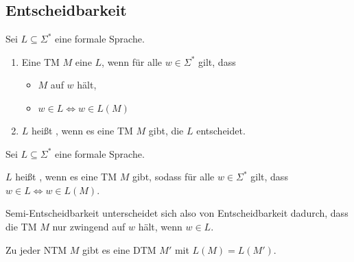 \subsection{Entscheidbarkeit}

\begin{definition}[Entscheidbarkeit]
	Sei $L \subseteq \Sigma^*$ eine formale Sprache.
	\begin{enumerate}
		\item
			Eine TM $M$  eine $L$, wenn für alle 
			$w \in \Sigma^*$ gilt, dass
			\begin{itemize}
				\item
					$M$ auf $w$ hält,
				\item
					$w \in L \Longleftrightarrow w \in L(M)$
			\end{itemize}
		\item
			$L$ heißt
			, wenn es eine TM $M$ gibt, die $L$ 
			entscheidet.
	\end{enumerate}
\end{definition}

\begin{definition}
	Sei $L \subseteq \Sigma^*$ eine formale Sprache.

	$L$ heißt , wenn es eine TM $M$ gibt, sodass für
	alle $w \in \Sigma^*$ gilt, dass $w \in L \Longleftrightarrow w \in
	L(M)$.
\end{definition}

\begin{remark}
	Semi-Entscheidbarkeit unterscheidet sich also von Entscheidbarkeit
	dadurch, dass die TM $M$ nur zwingend auf $w$ hält, wenn $w \in L$.
\end{remark}

\begin{theorem}
	Zu jeder NTM $M$ gibt es eine DTM $M'$ mit $L(M) = L(M')$.
\end{theorem}

